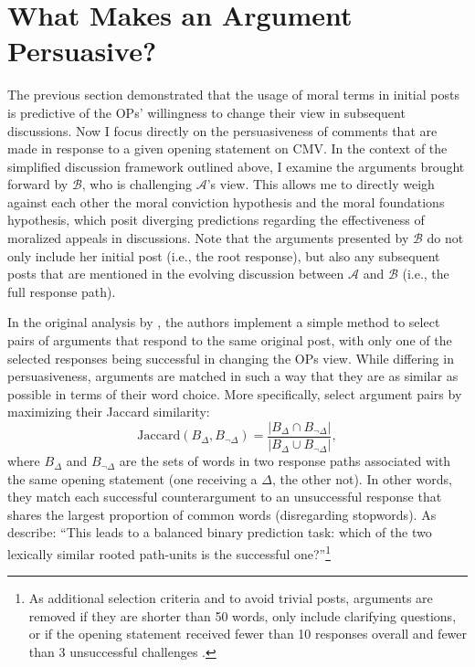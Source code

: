 \section{What Makes an Argument Persuasive?}


The previous section demonstrated that the usage of moral terms in initial posts is predictive of the OPs' willingness to change their view in subsequent discussions. Now I focus directly on the persuasiveness of comments that are made in response to a given opening statement on CMV. In the context of the simplified discussion framework outlined above, I examine the arguments brought forward by $\mathcal{B}$, who is challenging $\mathcal{A}$'s view. This allows me to directly weigh against each other the moral conviction hypothesis and the moral foundations hypothesis, which posit diverging predictions regarding the effectiveness of moralized appeals in discussions. Note that the arguments presented by $\mathcal{B}$ do not only include her initial post (i.e., the root response), but also any subsequent posts that are mentioned in the evolving discussion between $\mathcal{A}$ and $\mathcal{B}$ (i.e., the full response path).

In the original analysis by \citet{tan2016winning}, the authors implement a simple method to select pairs of arguments that respond to the same original post, with only one of the selected responses being successful in changing the OPs view. While differing in persuasiveness, arguments are matched in such a way that they are as similar as possible in terms of their word choice. More specifically, \citet{tan2016winning} select argument pairs by maximizing their Jaccard similarity:
\begin{equation}
\text{Jaccard}(B_\Delta,B_{\neg\Delta})=\dfrac{|B_\Delta\cap B_{\neg\Delta}|}{|B_\Delta\cup B_{\neg\Delta}|},
\end{equation}
where $B_\Delta$ and $B_{\neg\Delta}$ are the sets of words in two response paths associated with the same opening statement (one receiving a $\Delta$, the other not). In other words, they match each successful counterargument to an unsuccessful response that shares the largest proportion of common words (disregarding stopwords). As \citet[617]{tan2016winning} describe: ``This leads to a balanced binary prediction task: which of the two lexically similar rooted path-units is the successful one?''\footnote{As additional selection criteria and to avoid trivial posts, arguments are removed if they are shorter than 50 words, only include clarifying questions, or if the opening statement received fewer than 10 responses overall and fewer than 3 unsuccessful challenges \citep[see][617 for details]{tan2016winning}.}

